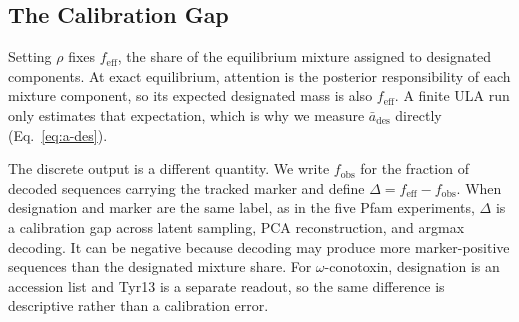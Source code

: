 \subsection{The Calibration Gap}\label{sec:gap}

Setting $\rho$ fixes $f_{\mathrm{eff}}$, the share of the equilibrium mixture assigned to
designated components. At exact equilibrium, attention is the posterior responsibility of each
mixture component, so its expected designated mass is also $f_{\mathrm{eff}}$. A finite ULA run
only estimates that expectation, which is why we measure $\bar{a}_{\mathrm{des}}$ directly
(Eq.~\ref{eq:a-des}).

The discrete output is a different quantity. We write $f_{\mathrm{obs}}$ for the fraction of
decoded sequences carrying the tracked marker and define
$\Delta=f_{\mathrm{eff}}-f_{\mathrm{obs}}$. When designation and marker are the same label, as
in the five Pfam experiments, $\Delta$ is a calibration gap across latent sampling, PCA
reconstruction, and argmax decoding. It can be negative because decoding may produce more
marker-positive sequences than the designated mixture share. For $\omega$-conotoxin,
designation is an accession list and Tyr13 is a separate readout, so the same difference is
descriptive rather than a calibration error.

